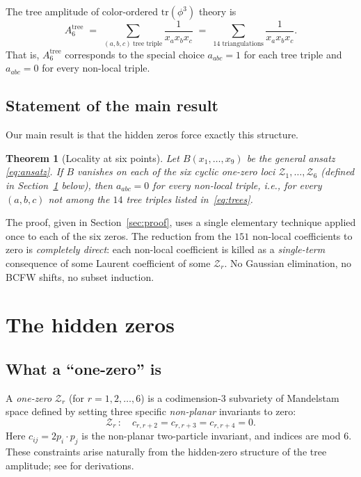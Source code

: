 \documentclass[11pt]{article}
\newcommand{\Z}{\mathcal{Z}}
\newtheorem{theorem}{Theorem}
\theoremstyle{definition}
\begin{document}
The tree amplitude of color-ordered $\mathrm{tr}(\phi^3)$ theory is
\begin{equation}
A_6^{\mathrm{tree}} \;=\; \sum_{(a,b,c)\ \text{tree triple}}
\frac{1}{x_a x_b x_c}
\;=\; \sum_{\text{14 triangulations}}\frac{1}{x_a x_b x_c}.
\end{equation}
That is, $A_6^{\mathrm{tree}}$ corresponds to the special choice
$a_{abc}=1$ for each tree triple and $a_{abc}=0$ for every non-local triple.

\subsection{Statement of the main result}

Our main result is that the hidden zeros force exactly this structure.

\begin{theorem}[Locality at six points]
\label{thm:locality}
Let $B(x_1,\dots,x_9)$ be the general ansatz \eqref{eq:ansatz}. If $B$
vanishes on each of the six cyclic one-zero loci $\Z_1,\dots,\Z_6$ (defined in
Section~\ref{sec:zeros} below), then $a_{abc}=0$ for every non-local triple,
i.e., for every $(a,b,c)$ not among the $14$ tree triples listed
in~\eqref{eq:trees}.
\end{theorem}

The proof, given in Section~\ref{sec:proof}, uses a single elementary
technique applied once to each of the six zeros. The reduction from
the $151$ non-local coefficients to zero is \emph{completely direct}:
each non-local coefficient is killed as a \emph{single-term} consequence of
some Laurent coefficient of some $\Z_r$. No Gaussian elimination, no BCFW
shifts, no subset induction.

\section{The hidden zeros}
\label{sec:zeros}

\subsection{What a ``one-zero'' is}

A \emph{one-zero} $\Z_r$ (for $r=1,2,\dots,6$) is a codimension-$3$ subvariety
of Mandelstam space defined by setting three specific \emph{non-planar}
invariants to zero:
\[
\Z_r\,:\quad c_{r,r+2}=c_{r,r+3}=c_{r,r+4}=0.
\]
Here $c_{ij}=2p_i\cdot p_j$ is the non-planar two-particle invariant, and
indices are mod $6$. These constraints arise naturally from the hidden-zero
structure of the tree amplitude; see \cite{rodina} for derivations.
\end{document}
